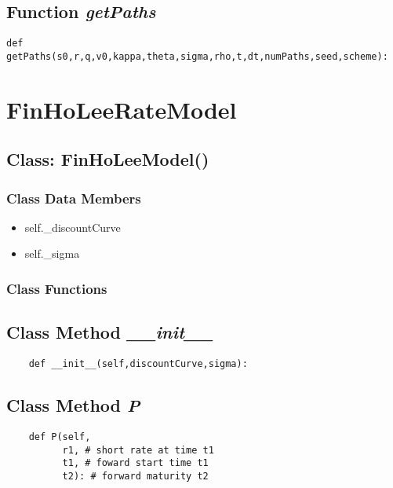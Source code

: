 \documentclass[twoside,11pt]{book}
\begin{document}
\subsection{Function {\it getPaths}}


\begin{lstlisting}
def getPaths(s0,r,q,v0,kappa,theta,sigma,rho,t,dt,numPaths,seed,scheme):
\end{lstlisting}

\newpage
\section{FinHoLeeRateModel}

\subsection{Class: FinHoLeeModel()}


\subsubsection{Class Data Members}
\begin{itemize}
\item{self.\_discountCurve}
\item{self.\_sigma}
\end{itemize}

\subsubsection{Class Functions}

\subsection{Class Method {\it \_\_init\_\_}}


\begin{lstlisting}
    def __init__(self,discountCurve,sigma):
\end{lstlisting}

\subsection{Class Method {\it P}}


\begin{lstlisting}
    def P(self,
          r1, # short rate at time t1
          t1, # foward start time t1
          t2): # forward maturity t2
\end{lstlisting}
\end{document}
